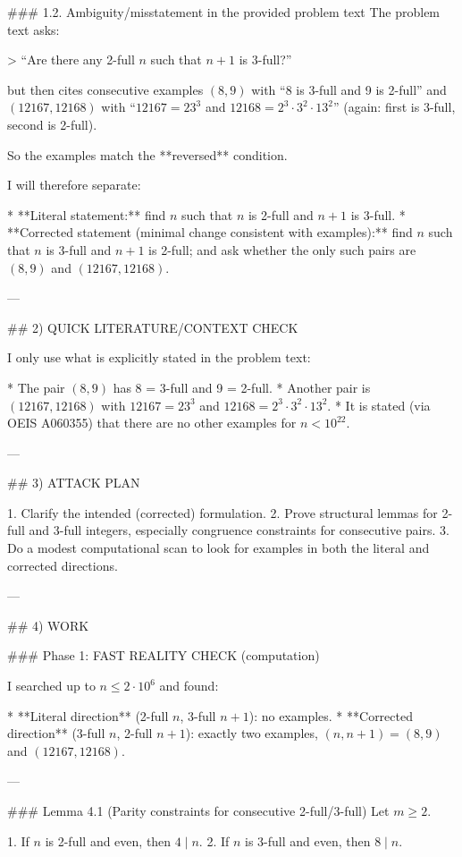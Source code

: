 ### 1.2. Ambiguity/misstatement in the provided problem text
The problem text asks:

> “Are there any 2-full \(n\) such that \(n+1\) is 3-full?”

but then cites consecutive examples \((8,9)\) with “8 is 3-full and 9 is 2-full” and
\((12167,12168)\) with “\(12167=23^3\) and \(12168=2^3\cdot 3^2\cdot 13^2\)” (again: first is 3-full,
second is 2-full).

So the examples match the **reversed** condition.

I will therefore separate:

* **Literal statement:** find \(n\) such that \(n\) is 2-full and \(n+1\) is 3-full.
* **Corrected statement (minimal change consistent with examples):** find \(n\) such that \(n\) is
  3-full and \(n+1\) is 2-full; and ask whether the only such pairs are \((8,9)\) and
  \((12167,12168)\).

---

## 2) QUICK LITERATURE/CONTEXT CHECK

I only use what is explicitly stated in the problem text:

* The pair \((8,9)\) has 8 = 3-full and 9 = 2-full.
* Another pair is \((12167,12168)\) with \(12167=23^3\) and \(12168=2^3\cdot 3^2\cdot 13^2\).
* It is stated (via OEIS A060355) that there are no other examples for \(n<10^{22}\).

---

## 3) ATTACK PLAN

1. Clarify the intended (corrected) formulation.
2. Prove structural lemmas for 2-full and 3-full integers, especially congruence constraints for
   consecutive pairs.
3. Do a modest computational scan to look for examples in both the literal and corrected directions.

---

## 4) WORK

### Phase 1: FAST REALITY CHECK (computation)

I searched up to \(n\le 2\cdot 10^6\) and found:

* **Literal direction** (2-full \(n\), 3-full \(n+1\)): no examples.
* **Corrected direction** (3-full \(n\), 2-full \(n+1\)): exactly two examples,
  \((n,n+1)=(8,9)\) and \((12167,12168)\).

---

### Lemma 4.1 (Parity constraints for consecutive 2-full/3-full)
Let \(m\ge 2\).

1. If \(n\) is 2-full and even, then \(4\mid n\).
2. If \(n\) is 3-full and even, then \(8\mid n\).

